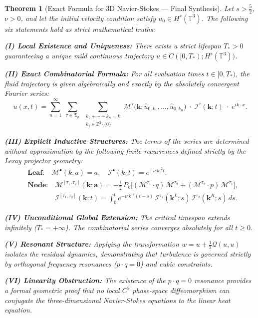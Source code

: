 \documentclass[12pt,a4paper]{article}
\theoremstyle{plain}
\newtheorem{theorem}{Theorem}[section]
\theoremstyle{definition}
\theoremstyle{remark}
\newcommand{\Hs}{H^s}
\newcommand{\T}{\mathbb{T}}
\newcommand{\Z}{\mathbb{Z}}
\newcommand{\QQ}{\mathcal{Q}}
\newcommand{\MM}{\mathcal{M}}
\newcommand{\II}{\mathcal{I}}
\newcommand{\fT}{\mathfrak{T}}
\begin{document}
\begin{theorem}[Exact Formula for 3D Navier-Stokes --- Final Synthesis]
\label{thm:final}
Let $s > \frac{5}{2}$, $\nu > 0$, and let the initial velocity condition satisfy $u_0 \in \Hs(\T^3)$. The following six statements hold as strict mathematical truths:

\noindent\textbf{(I) Local Existence and Uniqueness:} There exists a strict lifespan $T_* > 0$ guaranteeing a unique mild continuous trajectory $u \in C([0,T_*); \Hs(\T^3))$.

\noindent\textbf{(II) Exact Combinatorial Formula:} For all evaluation times $t \in [0, T_*)$, the fluid trajectory is given algebraically and exactly by the absolutely convergent Fourier series:
\[
  u(x,t) = \sum_{n=1}^{\infty}\;\sum_{\tau\in\fT_n}\; \sum_{\substack{k_1+\cdots+k_n=k\\k_j\in\Z^3\setminus\{0\}}} \MM^\tau\!\big(\mathbf{k};\hat{u}_{0,k_1},\dots,\hat{u}_{0,k_n}\big) \;\cdot\; \II^\tau(\mathbf{k};t) \;\cdot\; e^{ik\cdot x}.
\]

\noindent\textbf{(III) Explicit Inductive Structures:} The terms of the series are determined without approximation by the following finite recurrences defined strictly by the Leray projector geometry:
\begin{align*}
  &\textbf{Leaf:}\quad \MM^\bullet(k;a) = a, \quad \II^\bullet(k;t) = e^{-\nu|k|^2t}. \\[6pt]
  &\textbf{Node:}\quad \MM^{[\tau_1,\tau_2]}(\mathbf{k};\mathbf{a}) = -\frac{i}{2}\,P_k\Big[ (\MM^{\tau_1}\cdot q)\,\MM^{\tau_2} + (\MM^{\tau_2}\cdot p)\,\MM^{\tau_1} \Big], \\[6pt]
  &\phantom{\textbf{Node:}}\quad \II^{[\tau_1,\tau_2]}(\mathbf{k};t) = \int_0^t e^{-\nu|k|^2(t-s)}\, \II^{\tau_1}(\mathbf{k}^L;s)\, \II^{\tau_2}(\mathbf{k}^R;s)\,ds.
\end{align*}

\noindent\textbf{(IV) Unconditional Global Extension:} The critical timespan extends infinitely ($T_* = +\infty$). The combinatorial series converges absolutely for all $t \ge 0$.

\noindent\textbf{(V) Resonant Structure:} Applying the transformation $w = u + \frac{1}{2}\QQ(u,u)$ isolates the residual dynamics, demonstrating that turbulence is governed strictly by orthogonal frequency resonances ($p \cdot q = 0$) and cubic constraints.

\noindent\textbf{(VI) Linearity Obstruction:} The existence of the $p \cdot q = 0$ resonance provides a formal geometric proof that no local $C^2$ phase-space diffeomorphism can conjugate the three-dimensional Navier-Stokes equations to the linear heat equation.
\end{theorem}
\end{document}
